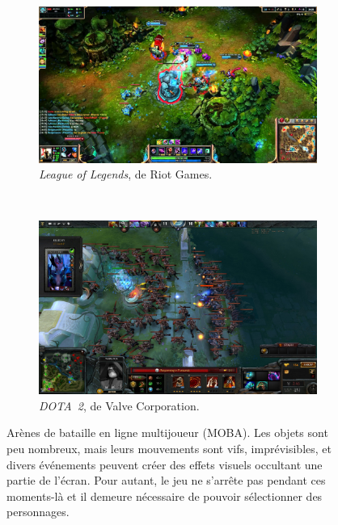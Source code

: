 	\begin{figure}[!htbp]
		\begin{subfigure}[t]{0.52\textwidth}
			\centering
			\includegraphics[width=\textwidth]{figures/ch1/lol}
			\caption[Une partie du MOBA \emph{League of Legends}]{\emph{League of Legends}, de Riot Games.}
			\label{fig:lol}
		\end{subfigure}
		~
		\begin{subfigure}[t]{0.46\textwidth}
			\centering
			\includegraphics[width=\textwidth]{figures/ch1/dota2}
			\caption[Une partie d'un MOBA, \emph{DOTA~2}]{\emph{DOTA~2}, de Valve Corporation.}
			\label{fig:dota2}
		\end{subfigure}
		\label{fig:mobas}
		\caption[Arènes de bataille en ligne multijoueur (MOBA)]{Arènes de bataille en ligne multijoueur (MOBA). Les objets sont peu nombreux, mais leurs mouvements sont vifs, imprévisibles, et divers événements peuvent créer des effets visuels occultant une partie de l'écran. Pour autant, le jeu ne s'arrête pas pendant ces moments-là et il demeure nécessaire de pouvoir sélectionner des personnages.}
	\end{figure}

